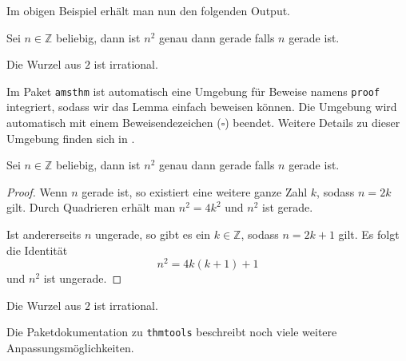 \begin{example}
\end{example}

Im obigen Beispiel erhält man nun den folgenden Output.

\begin{LTXexample}[firstline=2]
\setcounter{thm}{0}
\begin{lem}
    Sei $n \in \mathbb Z$ 
    beliebig, dann ist $n^2$ 
    genau dann gerade 
    falls $n$ gerade ist.
\end{lem}

\begin{thm}
    Die Wurzel aus $2$ ist 
    irrational.
\end{thm}
\end{LTXexample}

Im Paket \texttt{amsthm} ist automatisch eine Umgebung für Beweise namens \texttt{proof} integriert, sodass wir das Lemma einfach beweisen können. Die Umgebung wird automatisch mit einem Beweisendezeichen ($\square$) beendet. Weitere Details zu dieser Umgebung finden sich in \cite{amsthm}.

\begin{LTXexample}[firstline=3]
\setcounter{thm}{0}
\setcounter{lem0}{0}
\begin{lem0}
    Sei $n \in \mathbb Z$ 
    beliebig, dann ist $n^2$ 
    genau dann gerade 
    falls $n$ gerade ist.
\end{lem0}

\begin{proof}
    Wenn $n$ gerade ist, 
    so existiert eine 
    weitere ganze Zahl $k$,
    sodass $n = 2 k$ gilt. 
    Durch Quadrieren erhält 
    man $n^2 = 4 k^2$ und 
    $n^2$ ist gerade.
    
    Ist andererseits $n$ 
    ungerade, so gibt es ein 
    $k \in \mathbb Z$, sodass 
    $n = 2 k + 1$ gilt. 
    Es folgt die Identität 
    \[n^2 = 4 k (k + 1) + 1\] 
    und $n^2$ ist ungerade.
\end{proof}

\begin{thm}
    Die Wurzel aus $2$ ist 
    irrational.
\end{thm}
\end{LTXexample}

Die Paketdokumentation \cite{thmtools} zu \texttt{thmtools} beschreibt noch viele weitere Anpassungsmöglichkeiten.



